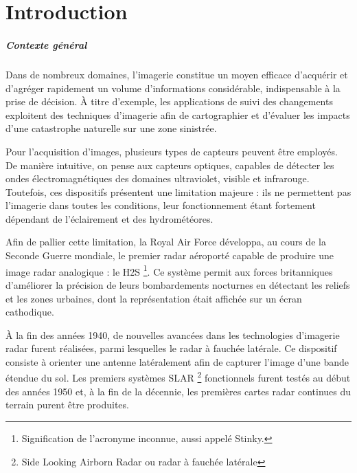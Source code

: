 \chapter{Introduction}\label{SEC:introdcution}
\newpage
\paragraph{Contexte général}
Dans de nombreux domaines, l’imagerie constitue un moyen efficace d’acquérir et d’agréger rapidement un volume d’informations considérable, indispensable à la prise de décision. À titre d’exemple, les applications de suivi des changements exploitent des techniques d’imagerie afin de cartographier et d’évaluer les impacts d’une catastrophe naturelle sur une zone sinistrée. 

Pour l’acquisition d’images, plusieurs types de capteurs peuvent être employés. De manière intuitive, on pense aux capteurs optiques, capables de détecter les ondes électromagnétiques des domaines ultraviolet, visible et infrarouge. Toutefois, ces dispositifs présentent une limitation majeure : ils ne permettent pas l’imagerie dans toutes les conditions, leur fonctionnement étant fortement dépendant de l’éclairement et des hydrométéores. 

Afin de pallier cette limitation, la Royal Air Force développa, au cours de la Seconde Guerre mondiale, le premier radar aéroporté capable de produire une image radar analogique : le H2S \footnote{Signification de l'acronyme inconnue, aussi appelé Stinky.}. Ce système permit aux forces britanniques d’améliorer la précision de leurs bombardements nocturnes en détectant les reliefs et les zones urbaines, dont la représentation était affichée sur un écran cathodique. 

À la fin des années 1940, de nouvelles avancées dans les technologies d’imagerie radar furent réalisées, parmi lesquelles le radar à fauchée latérale. Ce dispositif consiste à orienter une antenne latéralement afin de capturer l’image d’une bande étendue du sol. Les premiers systèmes SLAR \footnote{Side Looking Airborn Radar ou radar à fauchée latérale} fonctionnels furent testés au début des années 1950 et, à la fin de la décennie, les premières cartes radar continues du terrain purent être produites.

